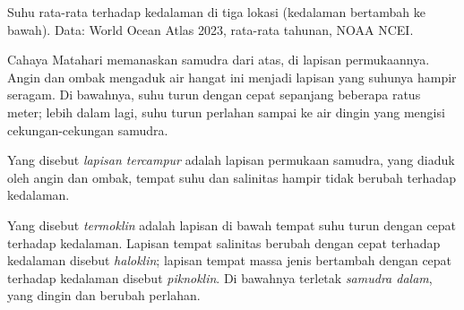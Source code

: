 \begin{omfigure}

{\small Suhu rata-rata terhadap kedalaman di tiga lokasi (kedalaman bertambah
ke bawah). Data: World Ocean Atlas 2023, rata-rata tahunan, NOAA NCEI.}
\end{omfigure}

Cahaya Matahari memanaskan samudra dari atas, di lapisan permukaannya. Angin
dan ombak mengaduk air hangat ini menjadi lapisan yang suhunya hampir seragam.
Di bawahnya, suhu turun dengan cepat sepanjang beberapa ratus meter; lebih
dalam lagi, suhu turun perlahan sampai ke air dingin yang mengisi
cekungan-cekungan samudra.

\begin{definition}\label{def:g10:layered-ocean:mixed-layer}
Yang disebut \emph{lapisan tercampur} adalah lapisan
permukaan samudra, yang diaduk oleh angin dan ombak, tempat suhu dan
salinitas hampir tidak berubah terhadap kedalaman.
\end{definition}

\begin{definition}\label{def:g10:layered-ocean:thermocline}
Yang disebut \emph{termoklin} adalah lapisan di bawah  tempat suhu turun dengan cepat terhadap kedalaman. Lapisan tempat
salinitas berubah dengan cepat terhadap kedalaman disebut
\emph{haloklin}; lapisan tempat massa jenis bertambah dengan
cepat terhadap kedalaman disebut \emph{piknoklin}. Di
bawahnya terletak \emph{samudra dalam}, yang dingin dan
berubah perlahan.
\end{definition}


